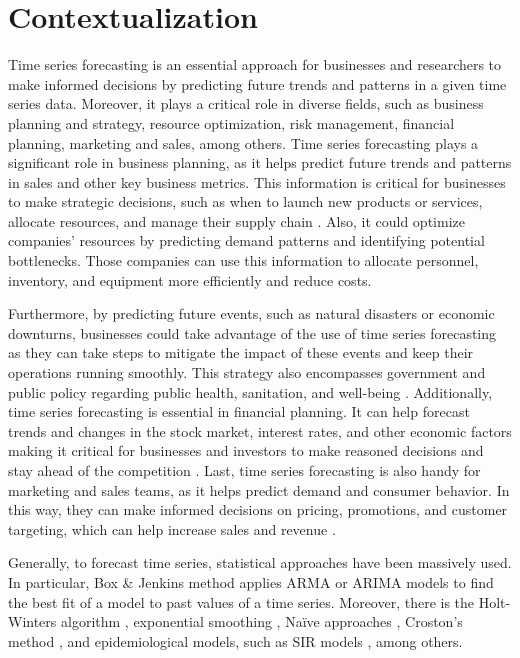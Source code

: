 \section{Contextualization} \label{sec:context}

Time series forecasting is an essential approach for businesses and researchers to make informed decisions by predicting future trends and patterns in a given time series data. Moreover, it plays a critical role in diverse fields, such as business planning and strategy, resource optimization, risk management, financial planning, marketing and sales, among others. Time series forecasting plays a significant role in business planning, as it helps predict future trends and patterns in sales and other key business metrics. This information is critical for businesses to make strategic decisions, such as when to launch new products or services, allocate resources, and manage their supply chain \cite{ma2021Retail}. Also, it could optimize companies' resources by predicting demand patterns and identifying potential bottlenecks. Those companies can use this information to allocate personnel, inventory, and equipment more efficiently and reduce costs.

Furthermore, by predicting future events, such as natural disasters or economic downturns, businesses could take advantage of the use of time series forecasting as they can take steps to mitigate the impact of these events and keep their operations running smoothly. This strategy also encompasses government and public policy regarding public health, sanitation, and well-being \cite{ribeiro2020Shortterm}. Additionally, time series forecasting is essential in financial planning. It can help forecast trends and changes in the stock market, interest rates, and other economic factors making it critical for businesses and investors to make reasoned decisions and stay ahead of the competition \cite{dasilva2020Multistep}. Last, time series forecasting is also handy for marketing and sales teams, as it helps predict demand and consumer behavior. In this way, they can make informed decisions on pricing, promotions, and customer targeting, which can help increase sales and revenue \cite{sohrabpour2021Export}.

Generally, to forecast time series, statistical approaches have been massively used. In particular, Box \& Jenkins method \cite{box2016Time} applies \ac{ARMA} or \ac{ARIMA} models to find the best fit of a model to past values of a time series. Moreover, there is the Holt-Winters algorithm \cite{holt2004Forecasting, winters1960Forecasting}, exponential smoothing \cite{brown1961Fundamental}, Na\"ive approaches \cite{ribenboim1979Naive}, Croston's method \cite{croston1972Forecasting}, and epidemiological models, such as \ac{SIR} models \cite{kermack1927Contribution}, among others.

